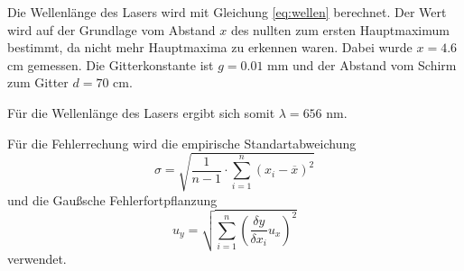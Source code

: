 Die Wellenlänge des Lasers wird mit Gleichung \ref{eq:wellen} berechnet. Der Wert wird auf der Grundlage vom Abstand $x$ des
nullten zum ersten Hauptmaximum bestimmt, da nicht mehr Hauptmaxima zu erkennen waren.
Dabei wurde $x = 4.6$ cm gemessen.
Die Gitterkonstante ist $g = 0.01$ mm und der Abstand vom Schirm zum Gitter $d = 70$ cm.

Für die Wellenlänge des Lasers ergibt sich somit $\lambda = 656$ nm.

Für die Fehlerrechung wird die empirische Standartabweichung
\begin{equation}
  \sigma = \sqrt{\frac{1}{n-1} \cdot \sum_{i=1}^n(x_i-\overline{x})^2}
  \label{eqn:Stdabweichung}
\end{equation}
und die Gaußsche Fehlerfortpflanzung
\begin{equation}
  u_y = \sqrt{\sum_{i=1}^n\left(\frac{\delta y}{\delta x_i}u_x\right)^2}
  \label{eqn:gauß}
\end{equation}
verwendet.
